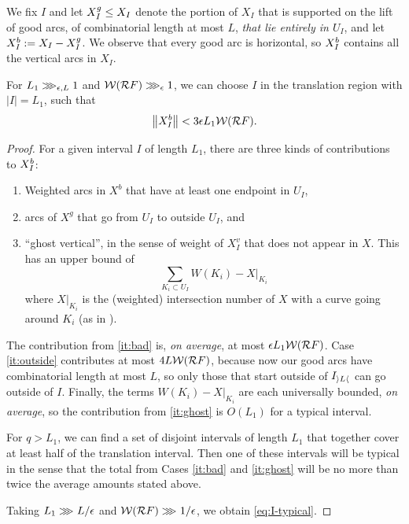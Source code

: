 We fix $I$ and let $X^g_I \le X_I$ denote the portion of $X_I$ that is supported on the lift of good arcs, of combinatorial length at most $L$,
\emph{that lie entirely in $U_I$},
and let $X^b_I := X_I - X^g_I$. We observe that every good arc is horizontal, so $X^b_I$ contains all the vertical arcs in $X_I$. 
\begin{lemma} \label{lem:I-typical}
For  $L_1 \ggg_{\epsilon, L} 1$ and $\mathcal W(\mathcal R F) \ggg_{\epsilon} 1$, we can choose $I$ in the translation region with $|I| = L_1$,
such that 
\begin{equation} \label{eq:I-typical}
\left\Vert X^b_I \right\Vert <  3\epsilon L_1 \mathcal W(\mathcal R F).
\end{equation}
\end{lemma}
\begin{proof}
For a given interval $I$ of length $L_1$, there are three kinds of contributions to $X^b_I$:
\begin{enumerate}
\item \label{it:bad}
Weighted arcs in $X^b$ that have at least one endpoint in $U_I$,
\item \label{it:outside}
arcs of $X^g$ that go from $U_I$ to outside $U_I$, and
\item \label{it:ghost}
``ghost vertical'', in the sense of weight of $X^v_I$ that does not appear in $X$. 
This has an upper bound of 
\begin{equation}
\sum_{K_i \subset U_I} W(K_i) - X|_{K_i}
\end{equation}
where $X|_{K_i}$ is the (weighted) intersection number of $X$ with a curve going around $K_i$ (as in \cite{K06}).	
\end{enumerate}
The contribution from \ref{it:bad} is, \emph{on average}, at most $\epsilon L_1\mathcal W(\mathcal R F)$.
Case \ref{it:outside} contributes at most $4L\mathcal W(\mathcal R F)$, 
because now our good arcs have combinatorial length at most $L$, 
so only those that start outside of $I_{\left>L\right<}$ can go outside of $I$.
Finally,
the terms $W(K_i) - X|_{K_i}$ are each universally bounded, \emph{on average}, so the contribution from \ref{it:ghost} is $O(L_1)$ for a typical interval. 

For $q > L_1$, we can find a set of disjoint intervals of length $L_1$ that together cover at least half of the translation interval. 
Then one of these intervals will be typical in the sense that the total from Cases \ref{it:bad} and \ref{it:ghost} will be no more than twice the  average amounts stated above. 

Taking $L_1 \ggg_{} L/\epsilon$ and $\mathcal W(\mathcal R F) \ggg_{} 1/\epsilon$, we obtain \eqref{eq:I-typical}.
\end{proof}

